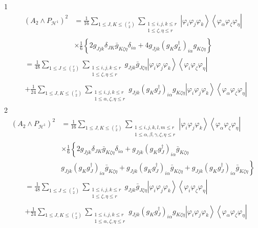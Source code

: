 \documentclass[aps,preprint]{revtex4}%
\begin{document}
1%
\begin{align}
\left(  A_{2}\wedge P_{\mathcal{H}^{1}}\right)  ^{2} &  =\frac{1}{16}%
\sum_{1\leq J,K\leq\binom{r}{2}}\sum_{\substack{1\leq i,j,k\leq r\\1\leq
\zeta,\eta\leq r}}\left\vert \varphi_{i}\varphi_{j}\varphi_{k}\right\rangle
\left\langle \varphi_{\alpha}\varphi_{\zeta}\varphi_{\eta}\right\vert \\
&  \times\frac{1}{6}\left\{  2g_{Jjk}\delta_{JK}\bar{g}_{K\zeta\eta}%
\delta_{i\alpha}+4g_{Jjk}\left(  g_{K}g_{L}^{\dagger}\right)  _{i\alpha
}g_{K\zeta\eta}\right\}
\end{align}%
\begin{align}
& =\frac{1}{48}\sum_{1\leq J\leq\binom{r}{2}}\sum_{\substack{1\leq i,j,k\leq
r\\1\leq\zeta,\eta\leq r}}g_{Jjk}\bar{g}_{J\zeta\eta}\left\vert \varphi
_{i}\varphi_{j}\varphi_{k}\right\rangle \left\langle \varphi_{i}\varphi
_{\zeta}\varphi_{\eta}\right\vert \\
& +\frac{1}{24}\sum_{1\leq J,K\leq\binom{r}{2}}\sum_{\substack{1\leq i,j,k\leq
r\\1\leq\alpha,\zeta,\eta\leq r}}g_{Jjk}\left(  g_{K}g_{J}^{\dagger}\right)
_{i\alpha}g_{K\zeta\eta}\left\vert \varphi_{i}\varphi_{j}\varphi
_{k}\right\rangle \left\langle \varphi_{\alpha}\varphi_{\zeta}\varphi_{\eta
}\right\vert
\end{align}
2%
\begin{align}
\left(  A_{2}\wedge P_{\mathcal{H}^{1}}\right)  ^{2} &  =\frac{1}{16}%
\sum_{1\leq J,K\leq\binom{r}{2}}\sum_{\substack{1\leq i,j,k,l,m\leq
r\\1\leq\alpha,\beta,\gamma,\zeta,\eta\leq r}}\left\vert \varphi_{i}%
\varphi_{j}\varphi_{k}\right\rangle \left\langle \varphi_{\alpha}%
\varphi_{\zeta}\varphi_{\eta}\right\vert \\
&  \times\frac{1}{6}\left\{  2g_{Jjk}\delta_{JK}\bar{g}_{K\zeta\eta}%
\delta_{i\alpha}+g_{Jjk}\left(  g_{K}g_{J}^{\dagger}\right)  _{i\alpha}\bar
{g}_{K\zeta\eta}\right.  \\
&  \left.  g_{Jjk}\left(  g_{K}g_{J}^{\dagger}\right)  _{i\alpha}\bar
{g}_{K\zeta\eta}+g_{Jjk}\left(  g_{K}g_{J}^{\dagger}\right)  _{i\alpha}\bar
{g}_{K\zeta\eta}+g_{Jjk}\left(  g_{K}g_{J}^{\dagger}\right)  _{i\alpha}\bar
{g}_{K\zeta\eta}\right\}
\end{align}%
\begin{align}
& =\frac{1}{48}\sum_{1\leq J\leq\binom{r}{2}}\sum_{\substack{1\leq i,j,k\leq
r\\1\leq\zeta,\eta\leq r}}g_{Jjk}\bar{g}_{J\zeta\eta}\left\vert \varphi
_{i}\varphi_{j}\varphi_{k}\right\rangle \left\langle \varphi_{i}\varphi
_{\zeta}\varphi_{\eta}\right\vert \\
& +\frac{1}{24}\sum_{1\leq J,K\leq\binom{r}{2}}\sum_{\substack{1\leq i,j,k\leq
r\\1\leq\alpha,\zeta,\eta\leq r}}g_{Jjk}\left(  g_{K}g_{J}^{\dagger}\right)
_{i\alpha}g_{K\zeta\eta}\left\vert \varphi_{i}\varphi_{j}\varphi
_{k}\right\rangle \left\langle \varphi_{\alpha}\varphi_{\zeta}\varphi_{\eta
}\right\vert
\end{align}
\end{document}
